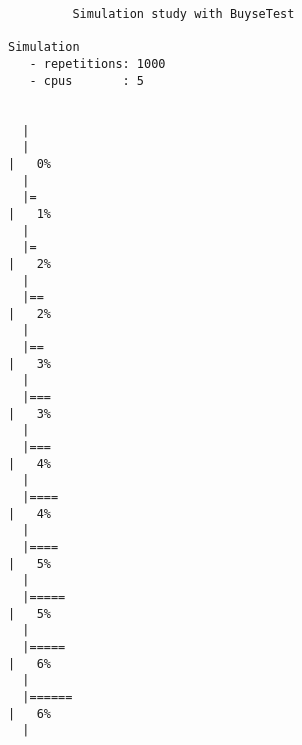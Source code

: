 \documentclass[12pt]{article}
\begin{document}
\begin{verbatim}
         Simulation study with BuyseTest 

Simulation
   - repetitions: 1000
   - cpus       : 5
 

  |                                                                                                
  |                                                                                          |   0%
  |                                                                                                
  |=                                                                                         |   1%
  |                                                                                                
  |=                                                                                         |   2%
  |                                                                                                
  |==                                                                                        |   2%
  |                                                                                                
  |==                                                                                        |   3%
  |                                                                                                
  |===                                                                                       |   3%
  |                                                                                                
  |===                                                                                       |   4%
  |                                                                                                
  |====                                                                                      |   4%
  |                                                                                                
  |====                                                                                      |   5%
  |                                                                                                
  |=====                                                                                     |   5%
  |                                                                                                
  |=====                                                                                     |   6%
  |                                                                                                
  |======                                                                                    |   6%
  |                                                                                                

\end{verbatim}
\end{document}

